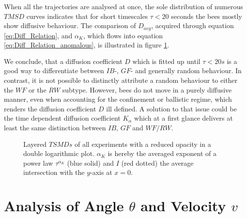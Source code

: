 When all the trajectories are analysed at once, the sole distribution of numerous $TMSD$ curves indicates that for short timescales $\tau < 20$ seconds the bees mostly show diffusive behaviour. The comparison of $D_{avg}$, acquired through equation \ref{eq:Diff_Relation}, and $\alpha_{K}$, which flows into equation \ref{eq:Diff_Relation_anomalous}, is illustrated in figure \ref{fig:MSD_timeavg_ALL}.

We conclude, that a diffusion coefficient $D$ which is fitted up until $\tau<20s$ is a good way to differentiate between $IB$-, $GF$- and generally random behaviour. In contrast, it is not possible to distinctly attribute a random behaviour to either the $WF$ or the $RW$ subtype.
However, bees do not move in a purely diffusive manner, even when accounting for the confinement or ballistic regime, which renders the diffusion coefficient $D$ ill defined.
A solution to that issue could be the time dependent diffusion coefficient $K_{\alpha}$ which at a first glance delivers at least the same distinction between $IB$, $GF$ and $WF/RW$. 

\begin{figure}
    \centering
    \caption{Layered $TSMDs$ of all experiments with a reduced opacity in a double logarithmic plot. $\alpha_{K}$ is hereby the averaged exponent of a power law $\tau^{\alpha_{K}}$ (blue solid) and $I$ (red dotted) the average intersection with the $y$-axis at $x=0$.} 
    \label{fig:MSD_timeavg_ALL}
\end{figure}

\newpage


\section{Analysis of Angle $\theta$ and Velocity $v$}
\label{sec:theta_and_velocity}
